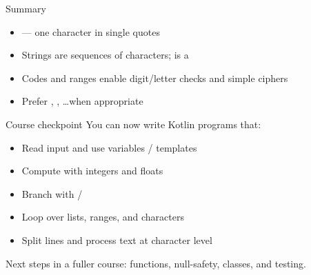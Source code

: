 \documentclass[aspectratio=169,11pt]{beamer}
\begin{document}
    \begin{frame}{Summary}
        \begin{itemize}
            \item {} --- one character in single quotes
            \item Strings are sequences of characters;  is a 
            \item Codes and ranges enable digit/letter checks and simple ciphers
            \item Prefer , , \ldots when appropriate
        \end{itemize}
    \end{frame}

    \begin{frame}{Course checkpoint}
        You can now write Kotlin programs that:
        \begin{itemize}
            \item Read input and use variables / templates
            \item Compute with integers and floats
            \item Branch with  / 
            \item Loop over lists, ranges, and characters
            \item Split lines and process text at character level
        \end{itemize}
        Next steps in a fuller course: functions, null-safety, classes, and testing.
    \end{frame}
\end{document}
